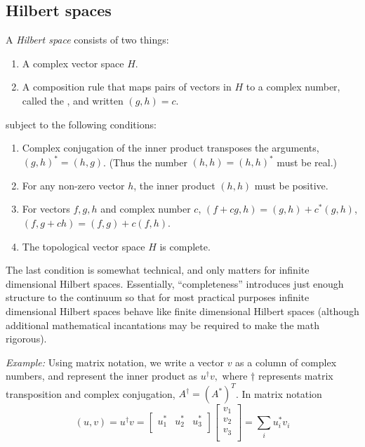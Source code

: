 \subsection{Hilbert spaces}

A {\sl Hilbert space} consists of two things:

 \begin{enumerate}
 \item A complex vector space $H$.
 \item A composition rule that maps pairs of vectors in $H$ to a complex number, called the , and written $(g,h)=c$.
 \end{enumerate}
 subject to the following conditions:
 \begin{enumerate}
 \item Complex conjugation of the inner product transposes the arguments, $(g, h)^* = (h, g)$. (Thus the number $(h,h)=(h,h)^*$ must be real.)
 \item For any non-zero vector $h$, the inner product $(h,h)$ must be positive. 
 \item For vectors $f,g,h$ and complex number $c$, $(f+cg,h) = (g,h)+ c^*(g,h)$, $(f, g+ch) = (f,g)+ c(f,h)$.
 \item The topological vector space $H$ is complete.
 \end{enumerate}
The last condition is somewhat technical, and only matters for infinite dimensional Hilbert spaces. Essentially, ``completeness'' introduces just enough structure to the continuum so that for most practical purposes infinite dimensional Hilbert spaces behave like finite dimensional Hilbert spaces (although additional mathematical incantations may be required to make the math rigorous).

{\sl Example:} Using matrix notation, we write a vector $v$ as a column of complex numbers, and represent the inner product as $u^\dagger v,$ where $\dagger$ represents  matrix transposition and complex conjugation, $A^{\dagger} = (A^*)^T$. In matrix notation
\[
(u, v) = 
u^\dagger v = 
\begin{bmatrix}
u^*_1 & u^*_2 & u^*_3\\
\end{bmatrix}
\begin{bmatrix}
v_1 \\ v_2 \\ v_3\\
\end{bmatrix}
= \sum_i u^*_i v_i
\]

